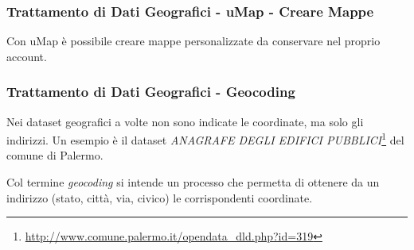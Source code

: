 \documentclass[8pt]{beamer}
\begin{document}
\begin{frame}
 \frametitle{Trattamento di Dati Geografici - uMap - Creare Mappe}

 Con uMap \`e possibile creare mappe personalizzate da conservare nel
 proprio account.
 \vspace{\baselineskip}
 
 \vspace{\baselineskip}

 \vspace{\baselineskip}

\end{frame}

\begin{frame}
 \frametitle{Trattamento di Dati Geografici - Geocoding}
 
 Nei dataset geografici a volte non sono indicate le coordinate,
 ma solo gli indirizzi. Un esempio \`e il dataset 
 \emph{ANAGRAFE DEGLI EDIFICI PUBBLICI}\footnote{\url{http://www.comune.palermo.it/opendata_dld.php?id=319}}
 del comune di Palermo.
 \vspace{\baselineskip}

 Col termine \emph{geocoding} si intende un processo che permetta
 di ottenere da un indirizzo (stato, citt\`a, via, civico) le
 corrispondenti coordinate.
 \vspace{\baselineskip}
 
\end{frame}
\end{document}
